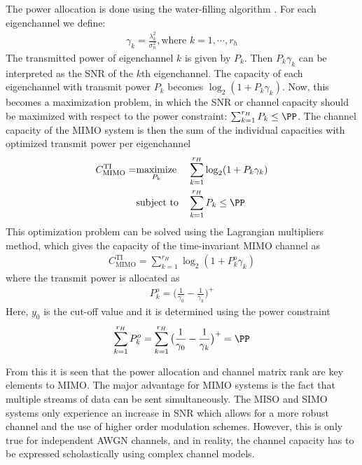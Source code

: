 The power allocation is done using the water-filling algorithm \cite{Tim2012Practical}. For each eigenchannel we define: 
\begin{align}%
  \gamma_k = \frac{\lambda_k^2}{\sigma_n^2}, \text{where } k = 1, \cdots, r_h
\end{align}
The transmitted power of eigenchannel $k$ is given by $P_k$. Then $P_k\gamma_k$ can be interpreted as the SNR of the $k$th eigenchannel. The capacity of each eigenchannel with transmit power $P_k$ becomes $\log_2 (1 + P_k\gamma_k)$. Now, this becomes a maximization problem, in which the SNR or channel capacity should be maximized with respect to the power constraint: $\sum_{k=1}^{r_H} P_k \leq \PP$. 
The channel capacity of the MIMO system is then the sum of the individual capacities with optimized transmit power per eigenchannel \cite{Tim2012Practical}
\begin{equation}%
\begin{aligned}
C^{\text{TI}}_{\text{MIMO}} = 
& \underset{P_k}{\text{maximize}}
& & \sum_{k=1}^{r_H} \log_2 (1 + P_k\gamma_k) \\
& \text{subject to}
& & \sum_{k=1}^{r_H} P_k \leq \PP
\end{aligned}
\end{equation}
This optimization problem can be solved using the Lagrangian multipliers method, which gives the capacity of the time-invariant MIMO channel as \cite{Tim2012Practical} 
\begin{align}%
  C^{\text{TI}}_{\text{MIMO}} = \sum_{k=1}^{r_H} \log_2 (1 + P^o_k\gamma_k)
\end{align}
where the transmit power is allocated as
\begin{align}
  P_k^o = \big(\frac{1}{\gamma_0} - \frac{1}{\gamma_k}\big)^+ 
\end{align}
Here, $y_0$ is the cut-off value and it is determined using the power constraint
\begin{align}%
  \sum_{k=1}^{r_H} P_k^o = \sum_{k=1}^{r_H} \big(\frac{1}{\gamma_0} - \frac{1}{\gamma_k}\big)^+ = \PP
\end{align}

From this it is seen that the power allocation and channel matrix rank are key elements to MIMO. The major advantage for MIMO systems is the fact that multiple streams of data can be sent simultaneously. The MISO and SIMO systems only experience an increase in SNR which allows for a more robust channel and the use of higher order modulation schemes. However, this is only true for independent AWGN channels, and in reality, the channel capacity has to be expressed scholastically using complex channel models.  

